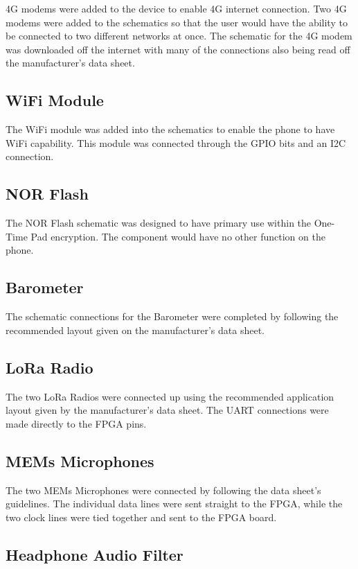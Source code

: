 	4G modems were added to the device to enable 4G internet connection. Two 4G modems were added to the schematics so that the user would have the ability to be connected to two different networks at once.
The schematic for the 4G modem was downloaded off the internet with many of the connections also being read off the manufacturer's data sheet. 

\subsection{WiFi Module}

	The WiFi module was added into the schematics to enable the phone to have WiFi capability. This module was connected through the GPIO bits and an I2C connection.

\subsection{NOR Flash}

	The NOR Flash schematic was designed to have primary use within the One-Time Pad encryption. The component would have no other function on the phone. 

\subsection{Barometer}

	The schematic connections for the Barometer were completed by following the recommended layout given on the manufacturer's data sheet. 

\subsection{LoRa Radio}

	The two LoRa Radios were connected up using the recommended application layout given by the manufacturer's data sheet. The UART connections were made directly to the FPGA pins.

\subsection{MEMs Microphones}
\label{chap:mics}

	The two MEMs Microphones were connected by following the data sheet's guidelines. The individual data lines were sent straight to the FPGA, while the two clock lines were tied together and sent to the FPGA board. 

\subsection{Headphone Audio Filter} 
\label{chap:audio2}

